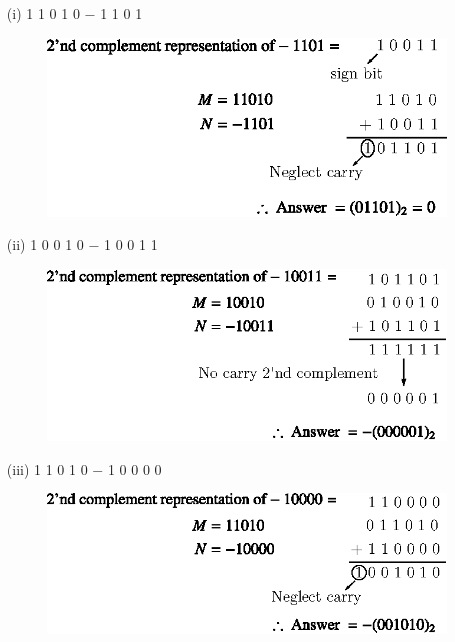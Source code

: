 \begin{solution}
\begin{itemize}
\item[(i)] 1 1 0 1 0 $-$ 1 1 0 1
\begin{figure}[H]
\centering
\includegraphics{chap5/div42.eps}
\end{figure}

\item[(ii)] 1 0 0 1 0 $-$ 1 0 0 1 1
\begin{figure}[H]
\centering
\includegraphics{chap5/div43.eps}
\end{figure}

\eject

\item[(iii)] 1 1 0 1 0 $-$ 1 0 0 0 0
\begin{figure}[H]
\centering
\includegraphics{chap5/div44.eps}
\end{figure}


\end{itemize}
\end{solution}
